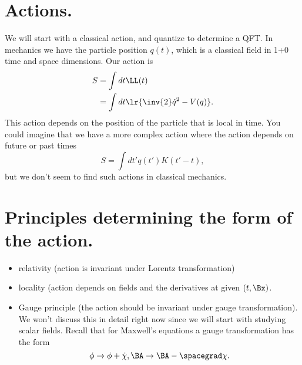 \section{Actions.}
We will start with a classical action, and quantize to determine a QFT.
In mechanics we have the particle position \( q(t) \), which is a classical field in 1+0 time and space dimensions.  Our action is
\begin{equation}\label{eqn:qftLecture3:360}
\begin{aligned}
S
&= \int dt \LL(t) \\
&= \int dt \lr{
\inv{2} \dot{q}^2 - V(q)
}.
\end{aligned}
\end{equation}
This action depends on the position of the particle that is local in time.
You could imagine that we have a more complex action where the action depends on future or past times
\begin{equation}\label{eqn:qftLecture3:380}
S
= \int dt' q(t') K( t' - t ),
\end{equation}
but we don't seem to find such actions in classical mechanics.

\section{Principles determining the form of the action.}
\begin{itemize}
\item relativity (action is invariant under Lorentz transformation)
\item locality (action depends on fields and the derivatives at given \((t, \Bx)\).
\item Gauge principle (the action should be invariant under gauge transformation).  We won't discuss this in detail right now since we will start with studying scalar fields.
Recall that for Maxwell's equations a gauge transformation has the form
\begin{equation}\label{eqn:qftLecture3:520}
\phi \rightarrow \phi + \dot{\chi}, \BA \rightarrow \BA - \spacegrad \chi.
\end{equation}
\end{itemize}


